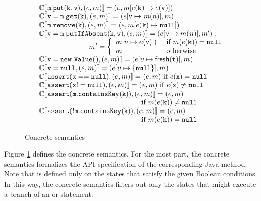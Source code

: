 \begin{figure}
	\[
	\begin{array}{l}
	\csemantics{C}{\statement{m.put(k, v)}, (e, m)} = 
	(e, m[e(\statement{k}) \mapsto e(\statement{v})])\\
	\csemantics{C}{\statement{v=m.get(k)}, (e, m)} = (e[\statement{v} \mapsto m(n)], m) \\
	\csemantics{C}{\statement{m.remove(k)}, (e, m)} = 
	(e, m[e(\statement{k}) \mapsto \statement{null}])\\
	\csemantics{C}{\statement{v = m.putIfAbsent(k, v)}, (e, m)} =  (e[\statement{v} \mapsto m(n)], m') : \\
	\hspace{70pt} 
	m'=
	\left\{
	\begin{array}{ll}
	m[n \mapsto e(\statement{v})]) & \textrm{ if } m(e(\statement{k})) = \statement{null}\\
	m & \textrm{ otherwise}\\
	\end{array}
	\right. \\
	\csemantics{C}{\statement{v = new\ Value()}, (e, m)} =  (e[v \mapsto \freshNode(\statement{t})], m)\\
	\csemantics{C}{\statement{v = null}, (e, m)} =  (e[v \mapsto \{\statement{null}\}], m)\\
	\csemantics{C}{\statement{assert(x==null)}, (e, m)} = (e,m) \textrm{ if } e(\statement{x})=\statement{null}\\
	\csemantics{C}{\statement{assert(x!=null)}, (e, m)} = (e,m ) \textrm{ if } e(\statement{x})\neq\statement{null}\\
	\csemantics{C}{\statement{assert(m.containsKey(k))}, (e, m)} = (e, m)\\
	\hspace{140pt} \textrm{ if } m(e(\statement{k})) \neq \statement{null}\\
	\csemantics{C}{\statement{assert(!m.containsKey(k))}, (e, m)} =(e, m)\\
	\hspace{140pt} \textrm{ if } m(e(\statement{k})) = \statement{null}\\
	\end{array}
	\]
	\caption{Concrete semantics}
	\label{fig:concretesemantics}
\end{figure}


Figure \ref{fig:concretesemantics} defines the concrete semantics. For the most part, the concrete semantics formalizes the API specification of the corresponding Java method. Note that  is defined only on the states that satisfy the given Boolean conditions. In this way, the concrete semantics filters out only the states that might execute a branch of an  or  statement.

